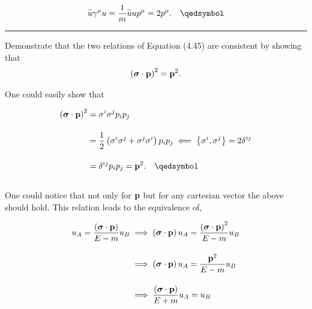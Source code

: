\begin{solution}
\begin{align*}
    \overbar{u}\gamma^\mu u  = \frac{1}{m}\overbar{u} u p^\mu = 2p^\mu. \qed
\end{align*}
\end{solution}

\noindent\rule{7in}{1.5pt}


\begin{problem}{4.10}
Demonstrate that the two relations of Equation (4.45) are consistent by showing that
\begin{align*}
    \left( \boldsymbol{\sigma} \cdot \mathbf{p} \right)^2 = \mathbf{p}^2.
\end{align*}
\end{problem}
\begin{solution}
One could easily show that

\begin{align*}
    \left(\boldsymbol{\sigma}\cdot \boldp \right)^2 &= \sigma^i\sigma^j p_i p_j \\[0.15in]
                                                    &= \frac{1}{2} \left( \sigma^i\sigma^j  +  \sigma^j\sigma^i \right) p_i p_j \impliedby \left\{ \sigma^i, \sigma^j\right\} = 2\delta^{ij} \\[0.15in]
                                                    &= \delta^{ij} p_i p_j = \boldp^2. \qed
\end{align*}\\
One could notice that not only for $\mathbf{p}$ but for any cartesian vector the above should hold. This relation leads to the equivalence of, 

\begin{align*}
    u_A = \frac{\left(\boldsymbol{\sigma}\cdot \mathbf{p}\right)}{E-m} u_B &\implies \left(\boldsymbol{\sigma}\cdot \mathbf{p}\right) u_A = \frac{\left(\boldsymbol{\sigma}\cdot \mathbf{p}\right)^2}{E-m} u_B \\[0.15in]
                                                                       &\implies \left(\boldsymbol{\sigma}\cdot \mathbf{p}\right) u_A = \frac{ \mathbf{p}^2}{E-m} u_B \\[0.15in]
                                                                       &\implies \frac{\left(\boldsymbol{\sigma}\cdot \mathbf{p}\right)}{E+m} u_A = u_B 
\end{align*}
\end{solution}

